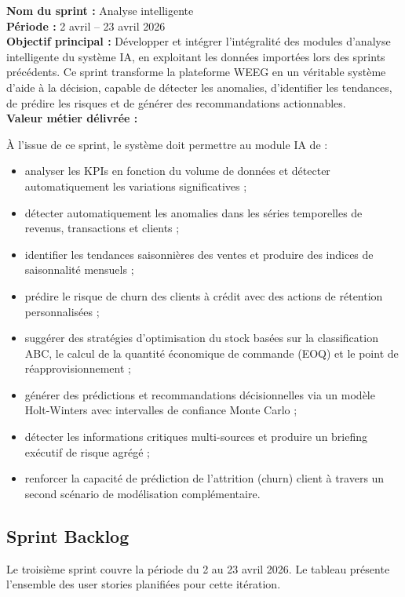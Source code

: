 \documentclass[a4paper,12pt]{report}
\begin{document}
\textbf{Nom du sprint :} Analyse intelligente \\
\textbf{Période :} 2 avril -- 23 avril 2026 \\[4pt]
\textbf{Objectif principal :}
Développer et intégrer l'intégralité des modules d'analyse intelligente
du système IA, en exploitant les données importées lors des sprints
précédents. Ce sprint transforme la plateforme WEEG en un véritable
système d'aide à la décision, capable de détecter les anomalies,
d'identifier les tendances, de prédire les risques et de générer des
recommandations actionnables. \\[4pt]
\textbf{Valeur métier délivrée :}
 
À l'issue de ce sprint, le système doit permettre au module IA de :
\begin{itemize}
    \item analyser les KPIs en fonction du volume de données et détecter
    automatiquement les variations significatives ;
    \item détecter automatiquement les anomalies dans les séries
    temporelles de revenus, transactions et clients ;
    \item identifier les tendances saisonnières des ventes et produire
    des indices de saisonnalité mensuels ;
    \item prédire le risque de churn des clients à crédit avec des
    actions de rétention personnalisées ;
    \item suggérer des stratégies d'optimisation du stock basées sur la
    classification ABC, le calcul de la quantité économique de commande
    (EOQ) et le point de réapprovisionnement ;
    \item générer des prédictions et recommandations décisionnelles via
    un modèle Holt-Winters avec intervalles de confiance Monte Carlo ;
    \item détecter les informations critiques multi-sources et produire
    un briefing exécutif de risque agrégé ;
    \item renforcer la capacité de prédiction de l'attrition (churn)
    client à travers un second scénario de modélisation complémentaire.
\end{itemize}
 
\subsection{Sprint Backlog}
 
Le troisième sprint couvre la période du 2 au 23 avril 2026. Le
tableau présente l'ensemble des user stories
planifiées pour cette itération.
 
\end{document}
